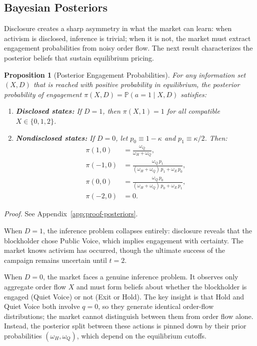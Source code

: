 \documentclass[11pt]{article}
\newtheorem{proposition}{Proposition}
\newcommand{\PP}{\mathbb{P}}
\newcommand{\1}{\mathbf{1}}
\begin{document}
%
\subsection{Bayesian Posteriors}
%

Disclosure creates a sharp asymmetry in what the market can learn: when activism is disclosed, inference is trivial; when it is not, the market must extract engagement probabilities from noisy order flow. The next result characterizes the posterior beliefs that sustain equilibrium pricing.

\begin{proposition}[Posterior Engagement Probabilities]
\label{prop:posteriors}
For any information set $(X,D)$ that is reached with positive probability in equilibrium, the posterior probability of engagement $\pi(X,D) = \PP(a=1 \mid X, D)$ satisfies:
\begin{enumerate}[label=(\alph*)]
\item \textbf{Disclosed states:} If $D = 1$, then $\pi(X, 1) = 1$ for all compatible $X \in \{0, 1, 2\}$.
\item \textbf{Nondisclosed states:} If $D = 0$, let $p_0 \equiv 1 - \kappa$ and $p_1 \equiv \kappa/2$. Then:
\begin{align*}
\pi(1, 0) &= \frac{\omega_Q}{\omega_H + \omega_Q}, \\
\pi(-1, 0) &= \frac{\omega_Q \, p_1}{(\omega_H + \omega_Q) \, p_1 + \omega_E \, p_0}, \\
\pi(0, 0) &= \frac{\omega_Q \, p_0}{(\omega_H + \omega_Q) \, p_0 + \omega_E \, p_1}, \\
\pi(-2, 0) &= 0.
\end{align*}
\end{enumerate}
\end{proposition}
\textit{Proof.} See Appendix~\ref{app:proof-posteriors}.

When $D=1$, the inference problem collapses entirely: disclosure reveals that the blockholder chose Public Voice, which implies engagement with certainty. The market knows activism has occurred, though the ultimate success of the campaign remains uncertain until $t=2$.

When $D=0$, the market faces a genuine inference problem. It observes only aggregate order flow $X$ and must form beliefs about whether the blockholder is engaged (Quiet Voice) or not (Exit or Hold). The key insight is that Hold and Quiet Voice both involve $q=0$, so they generate identical order-flow distributions; the market cannot distinguish between them from order flow alone. Instead, the posterior split between these actions is pinned down by their prior probabilities $(\omega_H,\omega_Q)$, which depend on the equilibrium cutoffs.
\end{document}

